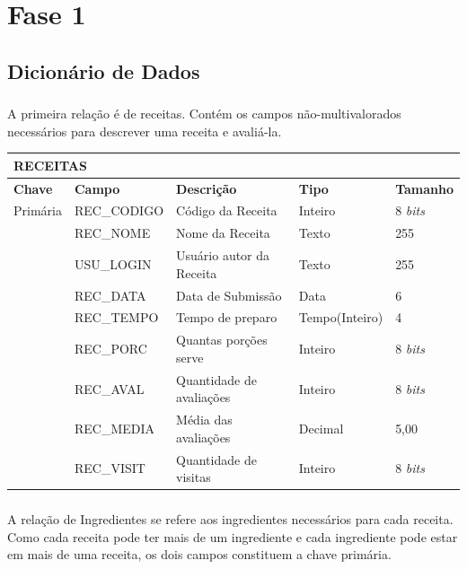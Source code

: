 \documentclass[paper=a4, fontsize=11pt]{scrartcl}	%
\numberwithin{equation}{section}															%
\numberwithin{figure}{section}																%
\numberwithin{table}{section}																%
\begin{document}
\section*{Fase 1}
\addtocounter{section}{1}
\addtocounter{subsection}{-3}


\subsection{Dicionário de Dados}


\subsubsection{} A primeira relação é de receitas. Contém os campos não-multivalorados necessários para descrever uma receita e avaliá-la.


\begin{center}
\begin{tabular}{ l l l l l }
  \multicolumn{5}{l}{\textbf{RECEITAS}} \\
  \hline
  \textbf{Chave} & \textbf{Campo} & \textbf{Descrição} & \textbf{Tipo} & \textbf{Tamanho} \\
  \cline{1-5}
  Primária & REC\_CODIGO & Código da Receita & Inteiro & 8 \emph{bits}  \\
   & REC\_NOME & Nome da Receita & Texto & 255 \\
   & USU\_LOGIN & Usuário autor da Receita & Texto & 255 \\
   & REC\_DATA & Data de Submissão & Data & 6 \\
   & REC\_TEMPO & Tempo de preparo & Tempo(Inteiro) & 4 \\
   & REC\_PORC & Quantas porções serve & Inteiro & 8 \emph{bits} \\
   & REC\_AVAL & Quantidade de avaliações & Inteiro & 8 \emph{bits} \\
   & REC\_MEDIA & Média das avaliações & Decimal & 5,00 \\
   & REC\_VISIT & Quantidade de visitas & Inteiro & 8 \emph{bits}
\end{tabular}
\end{center}

\vfill

\subsubsection{} A relação de Ingredientes se refere aos ingredientes necessários para cada receita. Como cada receita pode ter mais de um ingrediente e cada ingrediente pode estar em mais de uma receita, os dois campos constituem a chave primária.
\end{document}
